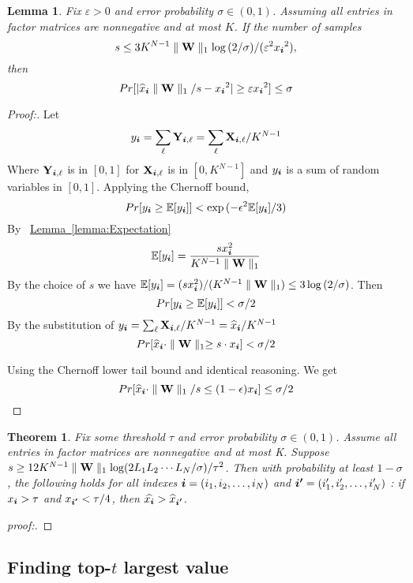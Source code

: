 \documentclass{article}
\newcommand{\V}[1]{{\bm{{\MakeLowercase{#1}}}}}%
\newcommand{\M}[1]{{\bm{\mathbf{\MakeUppercase{#1}}}}}%
\newcommand{\norm}[2]{\parallel#1\parallel_{#2}}
\newcommand{\Lem}[1]{\hyperref[lem:#1]{Lemma~\ref*{lemma:#1}}} %
\newtheorem{lemma}{Lemma}[section]
\newtheorem{theorem}{Theorem}[section]
\begin{document}
\begin{lemma}\label{lem:Bound}
Fix $\varepsilon > 0$ and error probability $\sigma \in (0,1)$. Assuming all entries in factor matrices are nonnegative and at most $K$. If the number of samples
\[
s \leq 3K^{N-1}\norm{\M{W}}{1}\log{(2/\sigma)}/(\varepsilon ^2{x_{\V{i}}}^2),
\]
then
\[
Pr[|{\widehat{x}_{\V{i}}}\norm{\M{W}}{1}/s-{x_{\V{i}}}^2| \geq \varepsilon{x_{\V{i}}}^2] \leq \sigma
\]
\end{lemma}

\begin{proof}[Proof:]
Let
\[
    y_{\V{i}} = \sum_{\ell}\M{Y}_{\V{i},\ell} = \sum_{\ell}\M{X}_{\V{i},\ell}/K^{N-1}
\]
Where $\M{Y}_{\V{i},\ell}$ is in $[0,1]$ for $\M{X}_{\V{i},\ell}$ is in $[0,K^{N-1}]$ and $y_{\V{i}}$ is a sum of random variables in $[0,1]$.
Applying the Chernoff bound,
\[
Pr[y_{\V{i}} \geq \mathbb{E}[y_{\V{i}}]] < \exp{(-\epsilon^2\mathbb{E}[y_{\V{i}}]/3)}
\]
By ~\Lem{Expectation}
\[
\mathbb{E}[y_{\V{i}}] = \frac{sx^2_{\V{i}}}{K^{N-1}\norm{\M{W}}{1}}
\]
By the choice of $s$ we have $\mathbb{E}[y_{\V{i}}]=(sx^2_{\V{i}})/(K^{N-1}\norm{\M{W}}{1}) \leq 3\log{(2/\sigma)}$. Then
\[
Pr[y_{\V{i}} \geq \mathbb{E}[y_{\V{i}}]] < \sigma/2
\]
By the substitution of $y_{\V{i}}=\sum_{\ell}\M{X}_{\V{i},\ell}/K^{N-1}=\widehat{x}_{\V{i}}/K^{N-1}$
\[
Pr[\widehat{x}_{\V{i}}\cdot\norm{\M{W}}{1} \geq s\cdot x_{\V{i}}] < \sigma/2
\]

Using the Chernoff lower tail bound and identical reasoning. We get
\[
Pr[\widehat{x}_{\V{i}}\cdot\norm{\M{W}}{1}/s \leq (1-\epsilon)x_{\V{i}}] \leq \sigma/2
\]
\end{proof}

\begin{theorem}\label{theo:Order}
Fix some threshold $\tau$ and error probability $\sigma\in(0,1)$. Assume all entries in factor matrices are nonnegative and at most  K. Suppose $s \geq 12K^{N-1}\norm{\M{W}}{1}\log(2L_1L_2\cdots L_N/\sigma)/{\tau^2}$. Then with probability at least $1-\sigma$, the following holds for all indexes $\V{i} = (i_1,i_2,\ldots,i_N)$ and $\V{i'} = (i'_1,i'_2,\ldots,i'_N)$ : if $x_{\V{i}}>\tau$ and $ x_{\V{i'}} < \tau/4$, then $\widehat{x_{\V{i}}}>\widehat{x}_{\V{i'}}$.
\end{theorem}

\begin{proof}[proof:]

\end{proof}

\subsection{Finding top-$t$ largest value}
\end{document}
